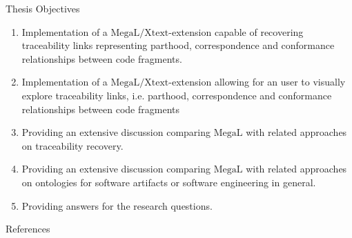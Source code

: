 \documentclass{beamer}
\newcommand{\megal}{\text{MegaL}}
\newcommand{\megalxtext}{\text{MegaL/Xtext}}
\begin{document}
\begin{frame}{Thesis Objectives}
\small
\begin{enumerate}[TO1]
\item
Implementation of a $\megalxtext$-extension\cite{LukasHaertelBScThesis} capable of recovering traceability links representing parthood, correspondence and conformance relationships between code fragments.

\item
Implementation of a $\megalxtext$-extension\cite{LukasHaertelBScThesis} allowing for an user to visually explore traceability links, i.e. parthood, correspondence and conformance relationships between code fragments

\item
Providing an extensive discussion comparing $\megal$\cite{DBLP:conf/models/FavreLV12} with related approaches on traceability recovery.

\item
Providing an extensive discussion comparing $\megal$\cite{DBLP:conf/models/FavreLV12} with related approaches on ontologies for software artifacts or software engineering in general.

\item
Providing answers for the research questions.
\end{enumerate}
\end{frame}

\begin{frame}{References}
\tiny{}
{}
\end{frame}
\end{document}
